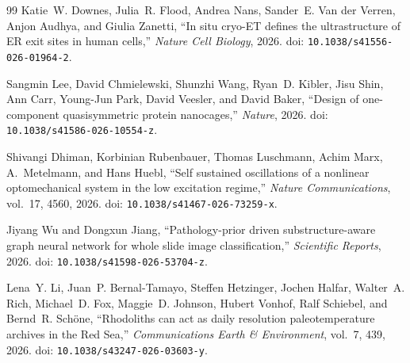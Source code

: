 \documentclass[11pt, oneside]{article}
\numberwithin{equation}{section}
\theoremstyle{rsvpstyle}
\theoremstyle{remark}
\begin{document}
\begin{thebibliography}{99}
Katie~W. Downes, Julia~R. Flood, Andrea Nans,
Sander~E. Van der Verren, Anjon Audhya, and Giulia Zanetti,
``In situ cryo-ET defines the ultrastructure of ER exit sites in human cells,''
\textit{Nature Cell Biology}, 2026.
doi: \texttt{10.1038/s41556-026-01964-2}.

Sangmin Lee, David Chmielewski, Shunzhi Wang,
Ryan~D. Kibler, Jisu Shin, Ann Carr, Young-Jun Park,
David Veesler, and David Baker,
``Design of one-component quasisymmetric protein nanocages,''
\textit{Nature}, 2026.
doi: \texttt{10.1038/s41586-026-10554-z}.

Shivangi Dhiman, Korbinian Rubenbauer, Thomas Luschmann,
Achim Marx, A.~Metelmann, and Hans Huebl,
``Self sustained oscillations of a nonlinear optomechanical system in the low
excitation regime,''
\textit{Nature Communications}, vol.~17, 4560, 2026.
doi: \texttt{10.1038/s41467-026-73259-x}.

Jiyang Wu and Dongxun Jiang,
``Pathology-prior driven substructure-aware graph neural network for whole slide image
classification,''
\textit{Scientific Reports}, 2026.
doi: \texttt{10.1038/s41598-026-53704-z}.

Lena~Y. Li, Juan~P. Bernal-Tamayo, Steffen Hetzinger,
Jochen Halfar, Walter~A. Rich, Michael~D. Fox,
Maggie~D. Johnson, Hubert Vonhof, Ralf Schiebel,
and Bernd~R. Sch\"{o}ne,
``Rhodoliths can act as daily resolution paleotemperature archives in the Red Sea,''
\textit{Communications Earth \& Environment}, vol.~7, 439, 2026.
doi: \texttt{10.1038/s43247-026-03603-y}.

\end{thebibliography}
\end{document}
